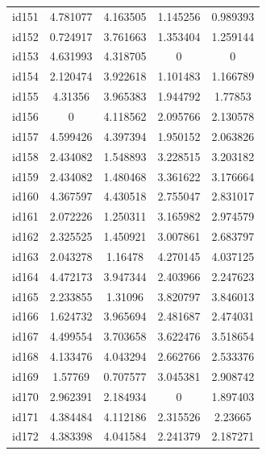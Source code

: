 \documentclass[num-refs]{wiley-article}
\begin{document}
\begin{center}
\begin{longtable}{ccccc}
id151     & 4.781077  & 4.163505       & 1.145256          & 0.989393          \\
id152     & 0.724917  & 3.761663       & 1.353404          & 1.259144          \\
id153     & 4.631993  & 4.318705       & 0                 & 0                 \\
id154     & 2.120474  & 3.922618       & 1.101483          & 1.166789          \\
id155     & 4.31356   & 3.965383       & 1.944792          & 1.77853           \\
id156     & 0         & 4.118562       & 2.095766          & 2.130578          \\
id157     & 4.599426  & 4.397394       & 1.950152          & 2.063826          \\
id158     & 2.434082  & 1.548893       & 3.228515          & 3.203182          \\
id159     & 2.434082  & 1.480468       & 3.361622          & 3.176664          \\
id160     & 4.367597  & 4.430518       & 2.755047          & 2.831017          \\
id161     & 2.072226  & 1.250311       & 3.165982          & 2.974579          \\
id162     & 2.325525  & 1.450921       & 3.007861          & 2.683797          \\
id163     & 2.043278  & 1.16478        & 4.270145          & 4.037125          \\
id164     & 4.472173  & 3.947344       & 2.403966          & 2.247623          \\
id165     & 2.233855  & 1.31096        & 3.820797          & 3.846013          \\
id166     & 1.624732  & 3.965694       & 2.481687          & 2.474031          \\
id167     & 4.499554  & 3.703658       & 3.622476          & 3.518654          \\
id168     & 4.133476  & 4.043294       & 2.662766          & 2.533376          \\
id169     & 1.57769   & 0.707577       & 3.045381          & 2.908742          \\
id170     & 2.962391  & 2.184934       & 0                 & 1.897403          \\
id171     & 4.384484  & 4.112186       & 2.315526          & 2.23665           \\
id172     & 4.383398  & 4.041584       & 2.241379          & 2.187271          \\

\end{longtable}
\end{center}
\end{document}
